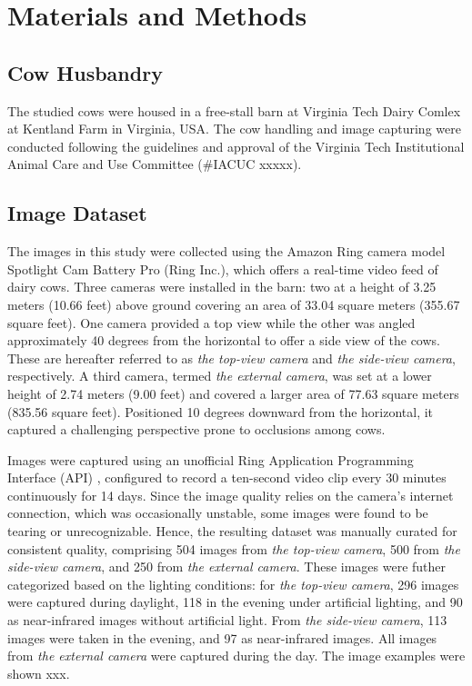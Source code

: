 \section{Materials and Methods}

\subsection*{Cow Husbandry}

The studied cows were housed in a free-stall barn at Virginia Tech Dairy Comlex at Kentland Farm in Virginia, USA. The cow handling and image capturing were conducted following the guidelines and approval of the Virginia Tech Institutional Animal Care and Use Committee (\#IACUC xxxxx).


\subsection*{Image Dataset}

The images in this study were collected using the Amazon Ring camera model Spotlight Cam Battery Pro (Ring Inc.), which offers a real-time video feed of dairy cows. Three cameras were installed in the barn: two at a height of 3.25 meters (10.66 feet) above ground covering an area of 33.04 square meters (355.67 square feet). One camera provided a top view while the other was angled approximately 40 degrees from the horizontal to offer a side view of the cows. These are hereafter referred to as \textit{the top-view camera} and \textit{the side-view camera}, respectively. A third camera, termed \textit{the external camera}, was set at a lower height of 2.74 meters (9.00 feet) and covered a larger area of 77.63 square meters (835.56 square feet). Positioned 10 degrees downward from the horizontal, it captured a challenging perspective prone to occlusions among cows.

Images were captured using an unofficial Ring Application Programming Interface (API) \citep{greif_dgreifring_2024}, configured to record a ten-second video clip every 30 minutes continuously for 14 days. Since the image quality relies on the camera's internet connection, which was occasionally unstable, some images were found to be tearing or unrecognizable. Hence, the resulting dataset was manually curated for consistent quality, comprising 504 images from \textit{the top-view camera}, 500 from \textit{the side-view camera}, and 250 from \textit{the external camera}. These images were futher categorized based on the lighting conditions: for \textit{the top-view camera}, 296 images were captured during daylight, 118 in the evening under artificial lighting, and 90 as near-infrared images without artificial light. From \textit{the side-view camera}, 113 images were taken in the evening, and 97 as near-infrared images. All images from \textit{the external camera} were captured during the day. The image examples were shown xxx.

